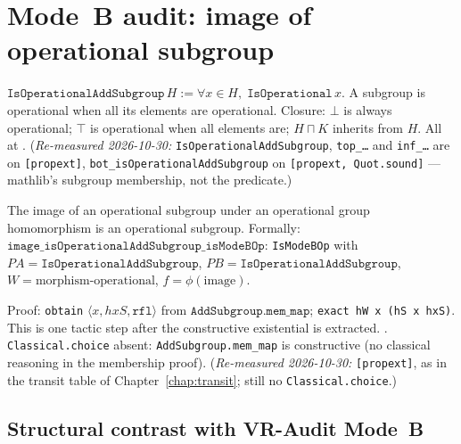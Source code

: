 \section{Mode~B audit: image of operational subgroup}
\label{sec:algebra_modeB}

\begin{definition}
\label{def:IsOperationalAddSubgroup}
\leanok
{}
$\texttt{IsOperationalAddSubgroup}\,H := \forall x \in H,\;
\texttt{IsOperational}\,x$.  A subgroup is operational when all its
elements are operational.
Closure: $\bot$ is always operational; $\top$ is operational when
all elements are; $H \sqcap K$ inherits from $H$.
All at \axiomprofile{[]}.  (\emph{Re-measured 2026-10-30:} \texttt{IsOperationalAddSubgroup},
\texttt{top\_\ldots} and \texttt{inf\_\ldots} are on \texttt{[propext]},
\texttt{bot\_isOperationalAddSubgroup} on \texttt{[propext, Quot.sound]} --- mathlib's
subgroup membership, not the predicate.)
\end{definition}

\begin{theorem}
\label{thm:image_modeB}
\leanok
{}
The image of an operational subgroup under an operational group homomorphism
is an operational subgroup.  Formally:
$\texttt{image\_isOperationalAddSubgroup\_isModeBOp}$:
\texttt{IsModeBOp} with $PA = \texttt{IsOperationalAddSubgroup}$,
$PB = \texttt{IsOperationalAddSubgroup}$, $W = \text{morphism-operational}$,
$f = \phi(\text{image})$.

Proof: \texttt{obtain} $\langle x, hxS, \texttt{rfl}\rangle$ from
$\texttt{AddSubgroup.mem\_map}$; \texttt{exact hW x (hS x hxS)}.
This is one tactic step after the constructive existential is extracted.
\axiomprofile{[]}.  \texttt{Classical.choice} absent: \texttt{AddSubgroup.mem\_map}
is constructive (no classical reasoning in the membership proof).
(\emph{Re-measured 2026-10-30:} \texttt{[propext]}, as in the transit table of
Chapter~\ref{chap:transit}; still no \texttt{Classical.choice}.)
\end{theorem}

\subsection*{Structural contrast with VR-Audit Mode~B}

